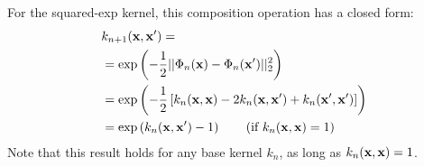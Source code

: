 \documentclass[twoside]{article}
\begin{document}
For the squared-exp kernel, this composition operation has a closed form:%
%
%
%
%
%
\begin{align}
& k_{n+1}({\bf{x}}, {\bf{x}}') = \nonumber \\
& = \exp \left( -\frac{1}{2} || \Phi_n({\bf{x}}) - \Phi_n({\bf{x}}')||_2^2 \right) \\
& = \exp \left( -\frac{1}{2} \left[ k_n({\bf{x}}, {\bf{x}}) - 2 k_n({\bf{x}}, {\bf{x}}') + k_n({\bf{x}}', {\bf{x}}') \right] \right) \nonumber\\
& = \exp \left( k_n({\bf{x}}, {\bf{x}}') - 1 \right) \qquad \textnormal{(if $k_n({\bf{x}}, {\bf{x}}) = 1$)}
\end{align}
%
%
%
Note that this result holds for any base kernel $k_n$, as long as $k_n( {\bf{x}}, {\bf{x}}) = 1$.
\end{document}
